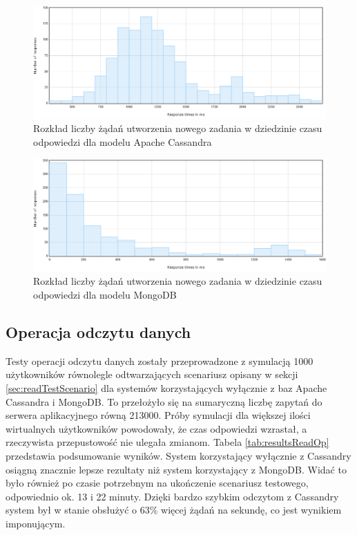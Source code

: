 \begin{figure}[!ht]
\centering
\includegraphics[width=\textwidth]{figures/flotResponseTimeDistribution_cass_save.png}
\caption{Rozkład liczby żądań utworzenia nowego zadania w dziedzinie czasu odpowiedzi dla modelu Apache Cassandra}
\label{fig:cassandraSaveTaskDistribution}
\end{figure}

\begin{figure}[!ht]
\centering
\includegraphics[width=\textwidth]{figures/flotResponseTimeDistribution_mongo_save.png}
\caption{Rozkład liczby żądań utworzenia nowego zadania w dziedzinie czasu odpowiedzi dla modelu MongoDB}
\label{fig:mongoSaveTaskDistribution}
\end{figure}

\subsection{Operacja odczytu danych}

Testy operacji odczytu danych zostały przeprowadzone z symulacją 1000 użytkowników równolegle odtwarzających scenariusz opisany w sekcji \ref{sec:readTestScenario} dla systemów korzystających wyłącznie z baz Apache Cassandra i MongoDB.
To przełożyło się na sumaryczną liczbę zapytań do serwera aplikacyjnego równą 213000.
Próby symulacji dla większej ilości wirtualnych użytkowników powodowały, że czas odpowiedzi wzrastał, a rzeczywista przepustowość nie ulegała zmianom.
Tabela \ref{tab:resultsReadOp} przedstawia podsumowanie wyników.
System korzystający wyłącznie z Cassandry osiągną znacznie lepsze rezultaty niż system korzystający z MongoDB.
Widać to było również po czasie potrzebnym na ukończenie scenariusz testowego, odpowiednio ok. 13 i 22 minuty.
Dzięki bardzo szybkim odczytom z Cassandry system był w stanie obsłużyć o 63\% więcej żądań na sekundę, co jest wynikiem imponującym.

